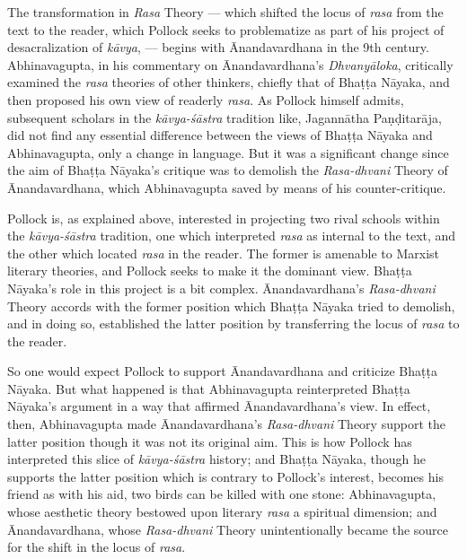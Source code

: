 The transformation in \textsl{Rasa} Theory --- which shifted the locus of \textsl{rasa} from the text to the reader, which Pollock seeks to problematize as part of his project of desacralization of \textsl{kāvya}, --- begins with Ānandavardhana in the 9th century. Abhinavagupta, in his commentary on Ānandavardhana's \textsl{Dhvanyāloka}, critically examined the \textsl{rasa} theories of other thinkers, chiefly that of Bhaṭṭa Nāyaka, and then proposed his own view of readerly \textsl{rasa}. As Pollock himself admits, subsequent scholars in the \textsl{kāvya-śāstra} tradition like, Jagannātha Paṇḍitarāja, did not find any essential difference between the views of Bhaṭṭa Nāyaka and Abhinavagupta, only a change in language. But it was a significant change since the aim of Bhaṭṭa Nāyaka's critique was to demolish the \textsl{Rasa-dhvani} Theory of Ānandavardhana, which Abhinavagupta saved by means of his counter-critique. 

Pollock is, as explained above, interested in projecting two rival schools within the \textsl{kāvya-śāstra} tradition, one which interpreted \textsl{rasa} as internal to the text, and the other which located \textsl{rasa} in the reader. The former is amenable to Marxist literary theories, and Pollock seeks to make it the dominant view. Bhaṭṭa Nāyaka's role in this project is a bit complex. Ānandavardhana's \textsl{Rasa-dhvani} Theory accords with the former position which Bhaṭṭa Nāyaka tried to demolish, and in doing so, established the latter position by transferring the locus of \textsl{rasa} to the reader. 

So one would expect Pollock to support Ānandavardhana and criticize Bhaṭṭa Nāyaka. But what happened is that Abhinavagupta reinterpreted Bhaṭṭa Nāyaka's argument in a way that affirmed Ānandavardhana's view. In effect, then, Abhinavagupta made Ānandavardhana's \textsl{Rasa-dhvani} Theory support the latter position though it was not its original aim. This is how Pollock has interpreted this slice of \textsl{kāvya-śāstra} history; and Bhaṭṭa Nāyaka, though he supports the latter position which is contrary to Pollock's interest, becomes his friend as with his aid, two birds can be killed with one stone: Abhinavagupta, whose aesthetic theory bestowed upon literary \textsl{rasa} a spiritual dimension; and Ānandavardhana, whose \textsl{Rasa-dhvani} Theory unintentionally became the source for the shift in the locus of \textsl{rasa}. 

